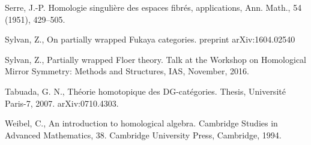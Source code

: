 \documentclass{gtpart}
\begin{document}
\begin{thebibliography}{9999}
 Serre, J.-P. Homologie singuli\`ere des espaces fibr\'es, applications, Ann. Math., 54
    (1951), 429--505. 

 Sylvan, Z., On partially wrapped Fukaya categories. preprint arXiv:1604.02540

 Sylvan, Z., Partially wrapped Floer theory. Talk at the Workshop on Homological
    Mirror Symmetry: Methods and Structures, IAS, November, 2016.

 Tabuada, G. N., Th\'eorie homotopique des DG-cat\'egories. Thesis, Universit\'e
    Paris-7, 2007. arXiv:0710.4303.

 Weibel, C., An introduction to homological algebra. Cambridge Studies in Advanced Mathematics, 38. Cambridge University Press, Cambridge, 1994.


\end{thebibliography}
\end{document}
